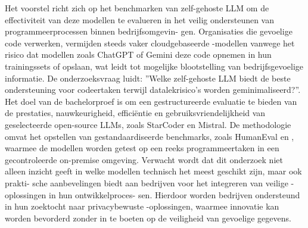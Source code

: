\documentclass[english,dit,thesis]{hogentreport}
\renewcommand{\cleardoublepage}{\clearpage}
\begin{document}
Het voorstel richt zich op het benchmarken van zelf-gehoste \gls{LLM} om de effectiviteit
van deze modellen te evalueren in het veilig ondersteunen van programmeerprocessen binnen bedrijfsomgevin-
gen. Organisaties die gevoelige code verwerken, vermijden steeds vaker cloudgebaseerde -modellen vanwege
het risico dat modellen zoals ChatGPT of Gemini deze code opnemen in hun trainingssets of opslaan, wat leidt
tot mogelijke blootstelling van bedrijfsgevoelige informatie. De onderzoeksvraag luidt: ”Welke zelf-gehoste LLM
biedt de beste ondersteuning voor codeertaken terwijl datalekrisico’s worden geminimaliseerd?”. Het doel van
de bachelorproef is om een gestructureerde evaluatie te bieden van de prestaties, nauwkeurigheid, efficiëntie
en gebruiksvriendelijkheid van geselecteerde open-source \glspl{LLM}, zoals StarCoder en Mistral. De methodologie
omvat het opstellen van gestandaardiseerde benchmarks, zoals HumanEval en , waarmee de modellen
worden getest op een reeks programmeertaken in een gecontroleerde on-premise omgeving. Verwacht wordt
dat dit onderzoek niet alleen inzicht geeft in welke modellen technisch het meest geschikt zijn, maar ook prakti-
sche aanbevelingen biedt aan bedrijven voor het integreren van veilige -oplossingen in hun ontwikkelproces-
sen. Hierdoor worden bedrijven ondersteund in hun zoektocht naar privacybewuste -oplossingen, waarmee
innovatie kan worden bevorderd zonder in te boeten op de veiligheid van gevoelige gegevens.




%


\backmatter{}

\setlength\bibitemsep{2pt} %
\printbibliography[heading=bibintoc]

\cleardoublepage
{}
{}
\printglossary[type=\acronymtype, title=Glossary, toctitle=Acronyms]
\end{document}
